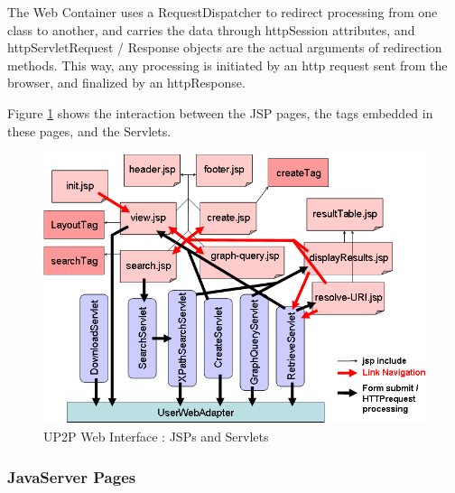 \documentclass[titlepage]{article}%
\begin{document}
The Web Container uses a RequestDispatcher to redirect processing from one class to another, and carries the data through httpSession attributes, and httpServletRequest / Response objects are the actual arguments of redirection methods. This way, any processing is initiated by an http request sent from the browser, and finalized by an httpResponse.

Figure \ref{fig:WebUI} shows the interaction between the JSP pages, the tags embedded in these pages, and the Servlets.

\begin{figure}[htb]
\centering
	\includegraphics[scale=0.5]{diagrams/JspsAndServlets.png}
	\caption{UP2P Web Interface : JSPs and Servlets}
	\label{fig:WebUI}
\end{figure}

\subsubsection{JavaServer Pages}
\end{document}
